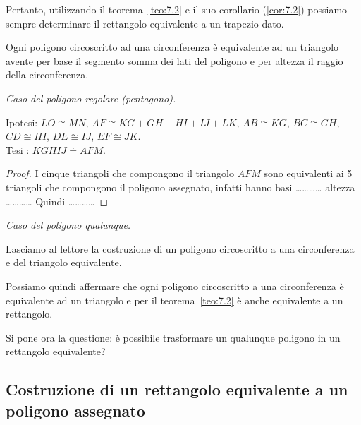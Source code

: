 Pertanto, utilizzando il teorema~\ref{teo:7.2} e il suo corollario 
(\ref{cor:7.2}) possiamo sempre determinare il rettangolo equivalente 
a un trapezio dato.

\begin{teorema}\label{teo:7.4}
Ogni poligono circoscritto ad una circonferenza è equivalente ad un 
triangolo avente per base il segmento somma dei lati del poligono e 
per altezza il raggio della circonferenza.
\end{teorema}

\noindent \emph{Caso del poligono regolare (pentagono).}\vspace{10pt}

\noindent Ipotesi: \(LO\cong MN\), \(AF\cong KG+GH+HI+IJ+LK\), \(AB\cong 
KG\), \(BC\cong GH\), \(CD\cong HI\), \(DE\cong IJ\), \(EF\cong JK\).\\
Tesi : \(KGHIJ\doteq AFM\).

\begin{figure*}[!htb]
	\centering
\end{figure*}

\begin{proof}
I cinque triangoli che compongono il triangolo \(AFM\) sono equivalenti 
ai 5 triangoli che compongono il poligono assegnato, infatti hanno 
basi \ldots\ldots\ldots\ldots{} altezza \ldots\ldots\ldots\ldots{} 
Quindi \ldots\ldots\ldots\ldots{}
\end{proof}\vspace{10pt}

\noindent \emph{Caso del poligono qualunque.}\vspace{10pt}

\noindent Lasciamo al lettore la costruzione di un poligono 
circoscritto a una circonferenza e del triangolo 
equivalente.\vspace{10pt}

Possiamo quindi affermare che ogni poligono circoscritto a una 
circonferenza è equivalente ad un triangolo e per il 
teorema~\ref{teo:7.2} è anche equivalente a un rettangolo.

Si pone ora la questione: è possibile trasformare un qualunque 
poligono in un rettangolo equivalente?

\subsection{Costruzione di un rettangolo equivalente a un poligono 
assegnato}

